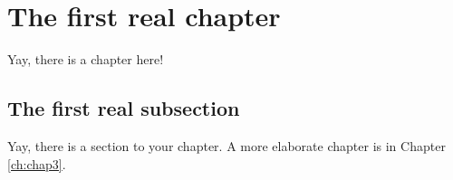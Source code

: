 \chapter{The first real chapter}\label{ch:chap2}

Yay, there is a chapter here!

\section{The first real subsection}\label{sec:firstrealsection}

Yay, there is a section to your chapter. A more elaborate chapter is in Chapter \ref{ch:chap3}.
